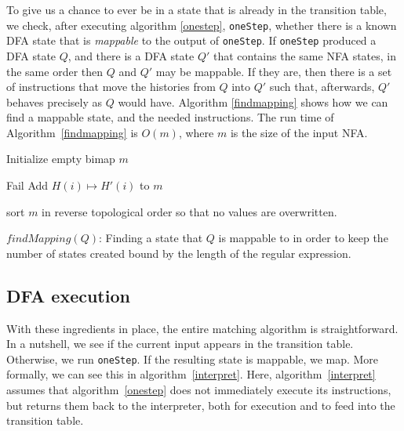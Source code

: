 \documentclass[english,twocolumn]{article}
\theoremstyle{definition}
\begin{document}
To give us a chance to ever be in a state that is already in the
transition table, we check, after executing algorithm \ref{onestep},
\texttt{oneStep}, whether there is a known DFA state that is
\emph{mappable} to the output of \texttt{oneStep}.  If \texttt{oneStep}
produced a DFA state $Q$, and there is a DFA state $Q'$ that contains
the same NFA states, in the same order then $Q$ and $Q'$ may be
mappable.  If they are, then there is a set of instructions that
move the histories from $Q$ into $Q'$ such that, afterwards, $Q'$
behaves precisely as $Q$ would have. Algorithm \ref{findmapping}
shows how we can find a mappable state, and the needed instructions.
The run time of Algorithm~\ref{findmapping} is $O(m)$, where $m$
is the size of the input NFA.

\begin{algorithm*}[htpb]
\begin{algorithmic}[1]
    

	\State Initialize empty bimap $m$ 
	
    
			
				\State Fail
			\Else
				\State Add $H(i) \mapsto H'(i)$ to $m$
			\EndIf
		\EndFor
    \EndFor
\EndFor
{}
  
	\State sort $m$ in reverse topological order so that no values are overwritten.
  
\caption{\label{findmapping}$findMapping(Q)$: Finding a state that $Q$ is mappable to in order to keep the number of states created bound by the length of the regular expression.}
\end{algorithmic}
\end{algorithm*}

\subsection{DFA execution}
With these ingredients in place, the entire matching algorithm is
straightforward.  In a nutshell, we see if the current input appears
in the transition table. Otherwise, we run \texttt{oneStep}. If the
resulting state is mappable, we map.  More formally, we can see
this in algorithm~\ref{interpret}. Here, algorithm~\ref{interpret} 
assumes that algorithm~\ref{onestep} does not immediately execute 
its instructions, but returns them back to the interpreter, both for 
execution and to feed into the transition table.
\end{document}
